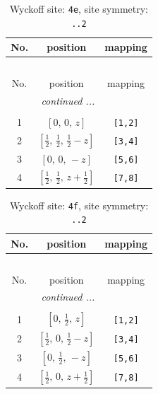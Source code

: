 \documentclass[fleqn,8pt]{jsarticle}
\begin{document}
\begin{longtable}{ccc}
\caption{Wyckoff site: {\tt 4e}, site symmetry: {\tt ..2}}
 \\
 \hline \hline
No. & position & mapping \\ \hline \endfirsthead

\multicolumn{2}{l}{\tablename\ \thetable{}} \\
 \hline \hline
No. & position & mapping \\ \hline \endhead

 \hline \hline
\multicolumn{2}{r}{\footnotesize\it continued ...} \\ \endfoot

 \hline \hline
\multicolumn{2}{r}{} \\ \endlastfoot

1 & $\left[ 0,\, 0,\, z \right]$ & {\tt [1,2]} \\ \hline
2 & $\left[ \frac{1}{2},\, \frac{1}{2},\, \frac{1}{2} - z \right]$ & {\tt [3,4]} \\ \hline
3 & $\left[ 0,\, 0,\, - z \right]$ & {\tt [5,6]} \\ \hline
4 & $\left[ \frac{1}{2},\, \frac{1}{2},\, z + \frac{1}{2} \right]$ & {\tt [7,8]} \\
\end{longtable}
\renewcommand{\arraystretch}{1.2}
\begin{longtable}{ccc}
\caption{Wyckoff site: {\tt 4f}, site symmetry: {\tt ..2}}
 \\
 \hline \hline
No. & position & mapping \\ \hline \endfirsthead

\multicolumn{2}{l}{\tablename\ \thetable{}} \\
 \hline \hline
No. & position & mapping \\ \hline \endhead

 \hline \hline
\multicolumn{2}{r}{\footnotesize\it continued ...} \\ \endfoot

 \hline \hline
\multicolumn{2}{r}{} \\ \endlastfoot

1 & $\left[ 0,\, \frac{1}{2},\, z \right]$ & {\tt [1,2]} \\ \hline
2 & $\left[ \frac{1}{2},\, 0,\, \frac{1}{2} - z \right]$ & {\tt [3,4]} \\ \hline
3 & $\left[ 0,\, \frac{1}{2},\, - z \right]$ & {\tt [5,6]} \\ \hline
4 & $\left[ \frac{1}{2},\, 0,\, z + \frac{1}{2} \right]$ & {\tt [7,8]} \\
\end{longtable}
\end{document}

